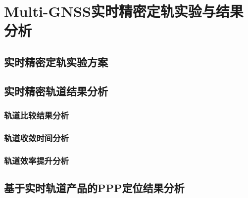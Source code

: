 
\chapter{Multi-GNSS实时精密定轨实验与结果分析}

\section{实时精密定轨实验方案}

\section{实时精密轨道结果分析}

\subsection{轨道比较结果分析}

\subsection{轨道收敛时间分析}

\subsection{轨道效率提升分析}

\section{基于实时轨道产品的PPP定位结果分析}